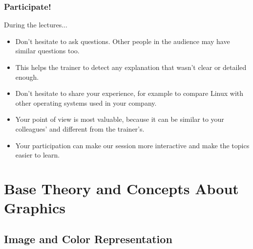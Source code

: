 \begin{frame}
\frametitle{Participate!}
During the lectures...
\begin{itemize}
\item Don't hesitate to ask questions. Other people in the audience may have
similar questions too.
\item This helps the trainer to detect any explanation that wasn't clear or
detailed enough.
\item Don't hesitate to share your experience, for example to compare Linux
with other operating systems used in your company.
\item Your point of view is most valuable, because it can be similar to your
colleagues' and different from the trainer's.
\item Your participation can make our session more interactive and make the
topics easier to learn.
\end{itemize}
\end{frame}

\section{Base Theory and Concepts About Graphics}

\subsection{Image and Color Representation}

